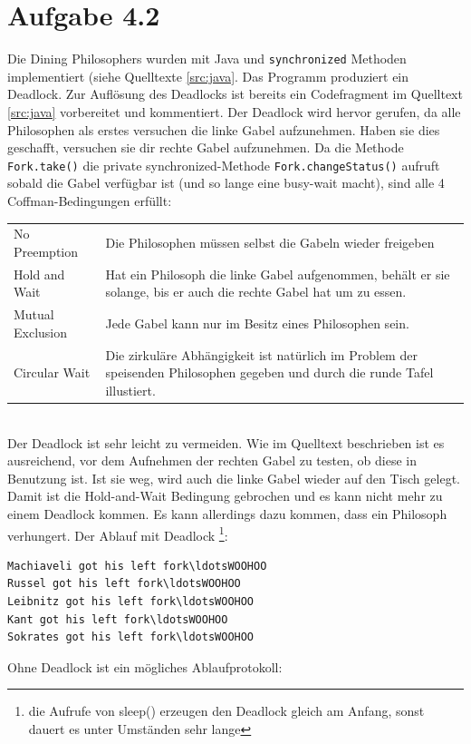 \documentclass[a4paper,
12pt,
BCOR12mm,
]{scrartcl}
\begin{document}
\section*{Aufgabe 4.2}
Die Dining Philosophers wurden mit Java und \verb|synchronized| Methoden
implementiert (siehe Quelltexte \ref{src:java}. Das Programm produziert ein
Deadlock. Zur Auflösung des Deadlocks ist bereits ein Codefragment im Quelltext
\ref{src:java} vorbereitet und kommentiert. 
Der Deadlock wird hervor gerufen, da alle Philosophen als erstes versuchen die
linke Gabel aufzunehmen. Haben sie dies geschafft, versuchen sie dir rechte
Gabel aufzunehmen. Da die Methode \verb|Fork.take()| die private
synchronized-Methode \verb|Fork.changeStatus()| aufruft sobald die Gabel
verfügbar ist (und so lange eine busy-wait macht), sind alle 4
Coffman-Bedingungen erfüllt:\\
\begin{tabular}{lp{11cm}}
  No Preemption     & Die Philosophen müssen selbst die Gabeln wieder freigeben \\
  Hold and Wait     & Hat ein Philosoph die linke Gabel aufgenommen, behält er sie solange, bis er auch die rechte Gabel hat um zu essen. \\
  Mutual Exclusion  & Jede Gabel kann nur im Besitz eines Philosophen sein. \\
  Circular Wait     & Die zirkuläre Abhängigkeit ist natürlich im Problem der speisenden Philosophen gegeben und durch die runde Tafel illustiert.
\end{tabular} \\
Der Deadlock ist sehr leicht zu vermeiden. Wie im Quelltext beschrieben ist es
ausreichend, vor dem Aufnehmen der rechten Gabel zu testen, ob diese in
Benutzung ist. Ist sie weg, wird auch die linke Gabel wieder auf den Tisch
gelegt. Damit ist die Hold-and-Wait Bedingung gebrochen und es kann nicht mehr
zu einem Deadlock kommen. Es kann allerdings dazu kommen, dass ein Philosoph
verhungert.
Der Ablauf mit Deadlock \footnote{die Aufrufe von sleep() erzeugen den Deadlock
gleich am Anfang, sonst dauert es unter Umständen sehr lange}:
\begin{verbatim}
Machiaveli got his left fork\ldotsWOOHOO
Russel got his left fork\ldotsWOOHOO
Leibnitz got his left fork\ldotsWOOHOO
Kant got his left fork\ldotsWOOHOO
Sokrates got his left fork\ldotsWOOHOO
\end{verbatim}
Ohne Deadlock ist ein mögliches Ablaufprotokoll:
\end{document}
